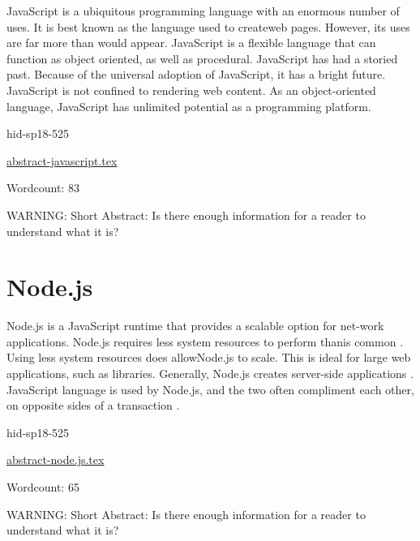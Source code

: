 JavaScript is a ubiquitous programming language with an
enormous number of uses. It is best known as the language
used to createweb pages\cite{hid-sp18-525-java}. However, its 
uses are far more than would appear. JavaScript is a flexible 
language that can function as object oriented, as well as 
procedural\cite{hid-sp18-525-java}. JavaScript has had a storied 
past\cite{hid-sp18-525-java}. Because of the universal adoption 
of JavaScript, it has a bright future. JavaScript is not 
confined to rendering web content. As an object-oriented 
language, JavaScript has unlimited potential as a 
programming platform\cite{hid-sp18-525-java}.


\begin{IU}

hid-sp18-525

\href{https://github.com/cloudmesh-community/hid-sp18-525/blob/master//technology/abstract-javascript.tex}{abstract-javascript.tex}

 

Wordcount: 83

WARNING: Short Abstract: Is there enough information for a reader to understand what it is?

\end{IU}

\section{Node.js}


Node.js is a JavaScript runtime that provides a scalable 
option for net-work applications. Node.js requires less 
system resources to perform thanis common
\cite{hid-sp18-525-nodejs}. Using less system resources does 
allowNode.js to scale. This is ideal for large web 
applications, such as libraries\cite{hid-sp18-525-nodejs}. 
Generally, Node.js creates server-side applications 
\cite{hid-sp18-525-nodejs}. JavaScript language is used by 
Node.js, and the two often compliment each
other, on opposite sides of a transaction 
\cite{hid-sp18-525-nodejs}.


\begin{IU}

hid-sp18-525

\href{https://github.com/cloudmesh-community/hid-sp18-525/blob/master//technology/abstract-node.js.tex}{abstract-node.js.tex}

 

Wordcount: 65

WARNING: Short Abstract: Is there enough information for a reader to understand what it is?

\end{IU}

